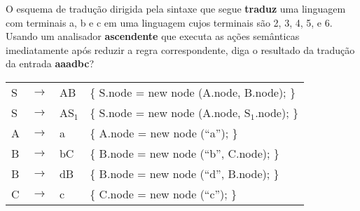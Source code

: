 \documentclass{compiladores}
\begin{document}
\begin{listanumerada}
\item O esquema de tradução dirigida pela sintaxe que segue \textbf{traduz}
     uma linguagem com terminais a, b e c em uma linguagem cujos
     terminais são 2, 3, 4, 5, e 6. Usando um analisador \textbf{ascendente}
     que executa as ações semânticas imediatamente após reduzir a
     regra correspondente, diga o resultado da tradução da entrada
     \textbf{aaadbc}?


     \begin{tabular}{llll}
       S  &  $\rightarrow$  &  AB      &  \{ S.node = new node (A.node, B.node); \}      \\
       S  &  $\rightarrow$  &  AS$_1$  &  \{ S.node = new node (A.node, S$_1$.node); \}  \\
       A  &  $\rightarrow$  &  a       &  \{ A.node = new node (``a''); \}               \\
       B  &  $\rightarrow$  &  bC      &  \{ B.node = new node (``b'', C.node); \}       \\
       B  &  $\rightarrow$  &  dB      &  \{ B.node = new node (``d'', B.node); \}       \\
       C  &  $\rightarrow$  &  c       &  \{ C.node = new node (``c''); \}               \\
     \end{tabular}

\end{listanumerada}
\end{document}
